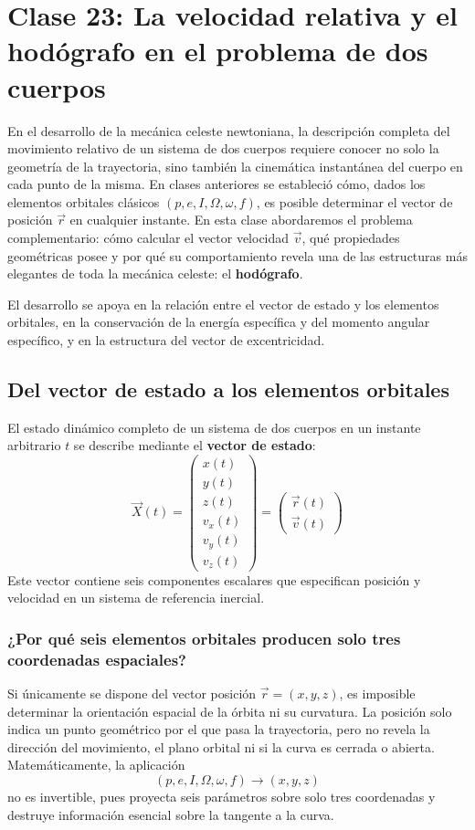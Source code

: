 \chapter{Clase 23: La velocidad relativa y el hodógrafo en el problema de dos cuerpos}

En el desarrollo de la mecánica celeste newtoniana, la descripción completa del movimiento relativo de un sistema de dos cuerpos requiere conocer no solo la geometría de la trayectoria, sino también la cinemática instantánea del cuerpo en cada punto de la misma. En clases anteriores se estableció cómo, dados los elementos orbitales clásicos \((p,e,I,\Omega,\omega,f)\), es posible determinar el vector de posición \(\vec{r}\) en cualquier instante. En esta clase abordaremos el problema complementario: cómo calcular el vector velocidad \(\vec{v}\), qué propiedades geométricas posee y por qué su comportamiento revela una de las estructuras más elegantes de toda la mecánica celeste: el \textbf{hodógrafo}.

El desarrollo se apoya en la relación entre el vector de estado y los elementos orbitales, en la conservación de la energía específica y del momento angular específico, y en la estructura del vector de excentricidad.

\section{Del vector de estado a los elementos orbitales}
El estado dinámico completo de un sistema de dos cuerpos en un instante arbitrario \(t\) se describe mediante el \textbf{vector de estado}:
\[
\vec{X}(t) =
\begin{pmatrix}
 x(t) \\
 y(t) \\
 z(t) \\
 v_x(t) \\
 v_y(t) \\
 v_z(t)
\end{pmatrix}
=
\begin{pmatrix}
 \vec{r}(t) \\
 \vec{v}(t)
\end{pmatrix}
\]
Este vector contiene seis componentes escalares que especifican posición y velocidad en un sistema de referencia inercial.

\subsection{¿Por qué seis elementos orbitales producen solo tres coordenadas espaciales?}
Si únicamente se dispone del vector posición \(\vec{r}=(x,y,z)\), es imposible determinar la orientación espacial de la órbita ni su curvatura. La posición solo indica un punto geométrico por el que pasa la trayectoria, pero no revela la dirección del movimiento, el plano orbital ni si la curva es cerrada o abierta. Matemáticamente, la aplicación
\[
(p,e,I,\Omega,\omega,f) \longrightarrow (x,y,z)
\]
no es invertible, pues proyecta seis parámetros sobre solo tres coordenadas y destruye información esencial sobre la tangente a la curva.

